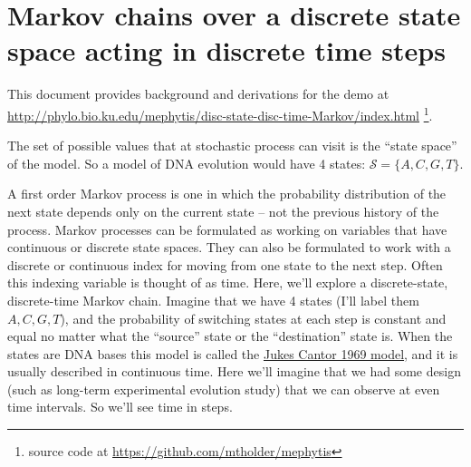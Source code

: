 \documentclass[11pt]{article}
\newcommand{\href}[2]{\url{#2}}
\begin{document}
\section*{Markov chains over a discrete state space acting in discrete time steps}

This document provides background and derivations for the demo at
    \url{http://phylo.bio.ku.edu/mephytis/disc-state-disc-time-Markov/index.html}
    \footnote{source code at \url{https://github.com/mtholder/mephytis}}.

The set of possible values that at stochastic process can visit is the ``state space'' of the model.
So a model of DNA evolution would have 4 states: $\mathcal{S} = \{A, C, G, T\}$.

A first order Markov process is one in which the probability distribution of the next state
    depends only on the current state -- not the previous history of the process.
Markov processes can be formulated as working on variables that have continuous or discrete state
    spaces.
They can also be formulated to work with a discrete or continuous index for moving from one state
    to the next step.
Often this indexing variable is thought of as time.
Here, we'll explore a discrete-state, discrete-time Markov chain.
Imagine that we have 4 states (I'll label them $A, C, G, T$), and the probability of switching
 states at each step is constant and equal no matter what the ``source'' state  or the
 ``destination'' state is.
When the states are DNA bases this model is called the
    \href{https://en.wikipedia.org/wiki/Models_of_DNA_evolution#JC69_model_(Jukes_and_Cantor_1969)}{Jukes Cantor 1969 model},
    and it is usually described in continuous time.
Here we'll imagine that we had some design (such as long-term experimental evolution study) that
    we can observe at even time intervals.
So we'll see time in steps.
\end{document}
